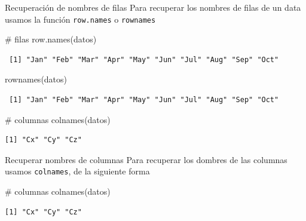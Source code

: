 \documentclass[
  ignorenonframetext,
  aspectratio=169,
  spanish,
]{beamer}
\newenvironment{Shaded}{\begin{snugshade}}{\end{snugshade}}
\newcommand{\CommentTok}[1]{\textcolor[rgb]{0.37,0.37,0.37}{#1}}
\newcommand{\FunctionTok}[1]{\textcolor[rgb]{0.28,0.35,0.67}{#1}}
\newcommand{\NormalTok}[1]{\textcolor[rgb]{0.00,0.23,0.31}{#1}}
\begin{document}
\begin{frame}[fragile]{Recuperación de nombres de filas}
\label{recuperaciuxf3n-de-nombres-de-filas}
Para recuperar los nombres de filas de un data usamos la función
\texttt{row.names} o \texttt{rownames}

\begin{Shaded}
\begin{Highlighting}[]
\CommentTok{\# filas }
\FunctionTok{row.names}\NormalTok{(datos) }
\end{Highlighting}
\end{Shaded}

\begin{verbatim}
 [1] "Jan" "Feb" "Mar" "Apr" "May" "Jun" "Jul" "Aug" "Sep" "Oct"
\end{verbatim}

\begin{Shaded}
\begin{Highlighting}[]
\FunctionTok{rownames}\NormalTok{(datos)}
\end{Highlighting}
\end{Shaded}

\begin{verbatim}
 [1] "Jan" "Feb" "Mar" "Apr" "May" "Jun" "Jul" "Aug" "Sep" "Oct"
\end{verbatim}

\begin{Shaded}
\begin{Highlighting}[]
\CommentTok{\# columnas }
\FunctionTok{colnames}\NormalTok{(datos) }
\end{Highlighting}
\end{Shaded}

\begin{verbatim}
[1] "Cx" "Cy" "Cz"
\end{verbatim}
\end{frame}

\begin{frame}[fragile]{Recuperar nombres de columnas}
\label{recuperar-nombres-de-columnas}
Para recuperar los dombres de las columnas usamos \texttt{colnames}, de
la siguiente forma

\begin{Shaded}
\begin{Highlighting}[]
\CommentTok{\# columnas }
\FunctionTok{colnames}\NormalTok{(datos) }
\end{Highlighting}
\end{Shaded}

\begin{verbatim}
[1] "Cx" "Cy" "Cz"
\end{verbatim}
\end{frame}
\end{document}
